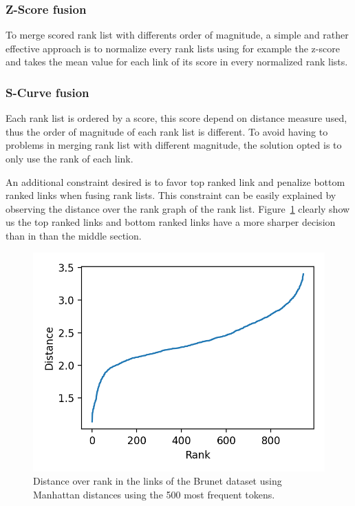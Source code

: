 \subsubsection{Z-Score fusion}

To merge scored rank list with differents order of magnitude, a simple and rather effective approach is to normalize every rank lists using for example the z-score and takes the mean value for each link of its score in every normalized rank lists.

\subsubsection{S-Curve fusion}

Each rank list is ordered by a score, this score depend on distance measure used, thus the order of magnitude of each rank list is different.
To avoid having to problems in merging rank list with different magnitude, the solution opted is to only use the rank of each link.

An additional constraint desired is to favor top ranked link and penalize bottom ranked links when fusing rank lists.
This constraint can be easily explained by observing the distance over the rank graph of the rank list.
Figure~\ref{fig:distance_over_rank} clearly show us the top ranked links and bottom ranked links have a more sharper decision than in than the middle section.

\begin{figure}
  \includegraphics[width=\linewidth]{img/distance_over_rank.png}
  \caption{Distance over rank in the links of the Brunet dataset using Manhattan distances using the 500 most frequent tokens.}
  \label{fig:distance_over_rank}
\end{figure}

